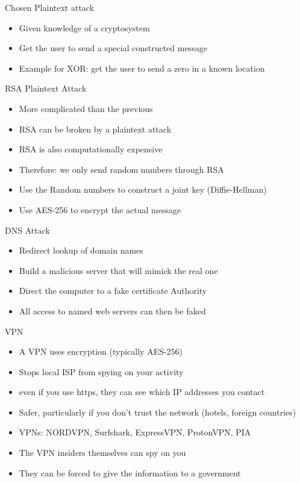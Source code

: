 \begin{withoutheadline}
\begin{frame}{Chosen Plaintext attack}
\begin{itemize}
    \item Given knowledge of a cryptosystem
    \item Get the user to send a special constructed message
    \item Example for XOR: get the user to send a zero in a known location
\end{itemize}
\end{frame}

\begin{frame}{RSA Plaintext Attack}
\begin{itemize}
    \item More complicated than the previous
    \item RSA can be broken by a plaintext attack
    \item RSA is also computationally expensive
    \item Therefore: we only send random numbers through RSA
    \item Use the Random numbers to construct a joint key (Diffie-Hellman)
    \item Use AES-256 to encrypt the actual message
\end{itemize}
\end{frame}

\begin{frame}{DNS Attack}
\begin{itemize}
    \item Redirect lookup of domain names
    \item Build a malicious server that will mimick the real one
    \item Direct the computer to a fake certificate Authority
    \item All access to named web servers can then be faked
\end{itemize}
\end{frame}

\begin{frame}{VPN}
\begin{itemize}
    \item A VPN uses encryption (typically AES-256)
    \item Stops local ISP from spying on your activity
    \item even if you use https, they can see which IP addresses you contact
    \item Safer, particularly if you don't trust the network (hotels, foreign countries)
    \item VPNs: NORDVPN, Surfshark, ExpressVPN, ProtonVPN, PIA 
    \item The VPN insiders themselves can spy on you
    \item They can be forced to give the information to a government
\end{itemize}
\end{frame}


\end{withoutheadline}
